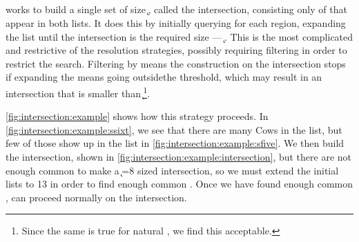 \subsection{\rintersect{}}
\rintersect{} works to build a single set of size \k{}, called the intersection, consisting only of \isols{} that appear in both \itsshort{} \knnlong{} lists.
It does this by initially querying for each \itsshort{} region, expanding the list until the intersection is the required size --- \k{}.
This is the most complicated and restrictive of the resolution strategies, possibly requiring \a{} filtering in order to restrict the search.
Filtering by \a{} means the construction on the intersection stops if expanding the \knnlong{} means going outsidethe \a{} threshold, which may result in an intersection that is smaller than \k{}\footnote{Since the same is true for natural \kNN{}, we find this acceptable.}.

\autoref{fig:intersection:example} shows how this strategy proceeds.
In \autoref{fig:intersection:example:ssixt}, we see that there are many Cows in the \Ssixt{} \knnlong{} list, but few of those \isols{} show up in the \Sfive{} \knnlong{} list in \autoref{fig:intersection:example:sfive}.
We then build the intersection, shown in \autoref{fig:intersection:example:intersection}, but there are not enough common \isols{} to make a \k{}=8 sized intersection, so we must extend the initial lists to 13 in order to find enough common \isols{}.
Once we have found enough common \isols{}, \kNN{} can proceed normally on the intersection.

